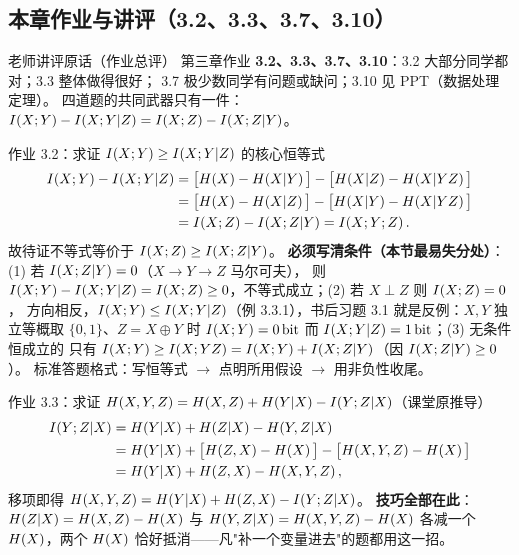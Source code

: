 \subsection{本章作业与讲评（3.2、3.3、3.7、3.10）}

\begin{keypoint}{老师讲评原话（作业总评）}
第三章作业 \textbf{3.2、3.3、3.7、3.10}：3.2 大部分同学都对；3.3 整体做得很好；
3.7 极少数同学有问题或缺问；3.10 见 PPT（数据处理定理）。
四道题的共同武器只有一件：$I\!\left(X;Y\right)-I\!\left(X;Y|Z\right)=I\!\left(X;Z\right)-I\!\left(X;Z|Y\right)$。
\end{keypoint}

\begin{example}{作业 3.2：求证 $I\!\left(X;Y\right)\ge I\!\left(X;Y|Z\right)$ 的核心恒等式}
\begin{align*}
\I{X;Y}-\I{X;Y|Z}
&=\big[\Hx{X}-\Hx{X|Y}\big]-\big[\Hx{X|Z}-\Hx{X|YZ}\big]\\
&=\big[\Hx{X}-\Hx{X|Z}\big]-\big[\Hx{X|Y}-\Hx{X|YZ}\big]\\
&=\I{X;Z}-\I{X;Z|Y}=\I{X;Y;Z}.
\end{align*}
故待证不等式等价于 $I\!\left(X;Z\right)\ge I\!\left(X;Z|Y\right)$。
\textbf{必须写清条件（本节最易失分处）}：(1) 若 $I\!\left(X;Z|Y\right)=0$（$X\to Y\to Z$ 马尔可夫），
则 $I\!\left(X;Y\right)-I\!\left(X;Y|Z\right)=I\!\left(X;Z\right)\ge0$，不等式成立；(2) 若 $X\perp Z$ 则 $I\!\left(X;Z\right)=0$，
方向相反，$I\!\left(X;Y\right)\le I\!\left(X;Y|Z\right)$（例 3.3.1），书后习题 3.1 就是反例：$X,Y$ 独立等概取
$\{0,1\}$、$Z=X\oplus Y$ 时 $I\!\left(X;Y\right)=0\,\text{bit}$ 而 $I\!\left(X;Y|Z\right)=1\,\text{bit}$；(3) 无条件恒成立的
只有 $I\!\left(X;Y\right)\ge I\!\left(X;YZ\right)=I\!\left(X;Y\right)+I\!\left(X;Z|Y\right)$（因 $I\!\left(X;Z|Y\right)\ge0$）。
标准答题格式：写恒等式 $\to$ 点明所用假设 $\to$ 用非负性收尾。
\end{example}

\begin{example}{作业 3.3：求证 $H\!\left(X,Y,Z\right)=H\!\left(X,Z\right)+H\!\left(Y|X\right)-I\!\left(Y;Z|X\right)$（课堂原推导）}
\begin{align*}
\I{Y;Z|X}&=\Hx{Y|X}+\Hx{Z|X}-\Hx{Y,Z|X}\\
&=\Hx{Y|X}+\big[\Hx{Z,X}-\Hx{X}\big]-\big[\Hx{X,Y,Z}-\Hx{X}\big]\\
&=\Hx{Y|X}+\Hx{Z,X}-\Hx{X,Y,Z},
\end{align*}
移项即得 $H\!\left(X,Y,Z\right)=H\!\left(Y|X\right)+H\!\left(Z,X\right)-I\!\left(Y;Z|X\right)$。
\textbf{技巧全部在此}：$H\!\left(Z|X\right)=H\!\left(X,Z\right)-H\!\left(X\right)$ 与 $H\!\left(Y,Z|X\right)=H\!\left(X,Y,Z\right)-H\!\left(X\right)$
各减一个 $H\!\left(X\right)$，两个 $H\!\left(X\right)$ 恰好抵消——凡"补一个变量进去"的题都用这一招。
\end{example}

